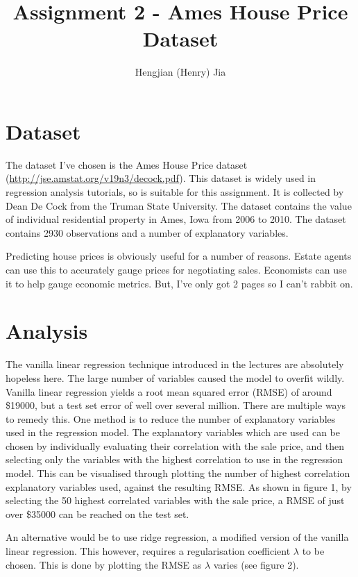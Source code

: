 \documentclass[11pt, twoside]{article}
\begin{document}
\title{Assignment 2 - Ames House Price Dataset}
\author{Hengjian (Henry) Jia}
\maketitle


\section{Dataset}

The dataset I've chosen is the Ames House Price dataset (\url{http://jse.amstat.org/v19n3/decock.pdf}). This dataset is widely used in regression analysis tutorials, so is suitable for this assignment. It is collected by Dean De Cock from the Truman State University. The dataset contains the value of individual residential property in Ames, Iowa  from 2006 to 2010. The dataset contains 2930 observations and a number of explanatory variables.

Predicting house prices is obviously useful for a number of reasons. Estate agents can use this to accurately gauge prices for negotiating sales. Economists can use it to help gauge economic metrics. But, I've only got 2 pages so I can't rabbit on.

\section{Analysis}

The vanilla linear regression technique introduced in the lectures are absolutely hopeless here. The large number of variables caused the model to overfit wildly. Vanilla linear regression yields a root mean squared error (RMSE) of around \$19000, but a test set error of well over several million. There are multiple ways to remedy this. One method is to reduce the number of explanatory variables used in the regression model. The explanatory variables which are used can be chosen by individually evaluating their correlation with the sale price, and then selecting only the variables with the highest correlation to use in the regression model. This can be visualised through plotting the number of highest correlation explanatory variables used, against the resulting RMSE. As shown in figure 1, by selecting the 50 highest correlated variables with the sale price, a RMSE of just over \$35000 can be reached on the test set.

An alternative would be to use ridge regression, a modified version of the vanilla linear regression. This however, requires a regularisation coefficient $\lambda$ to be chosen. This is done by plotting the RMSE as $\lambda$ varies (see figure 2).
\end{document}
